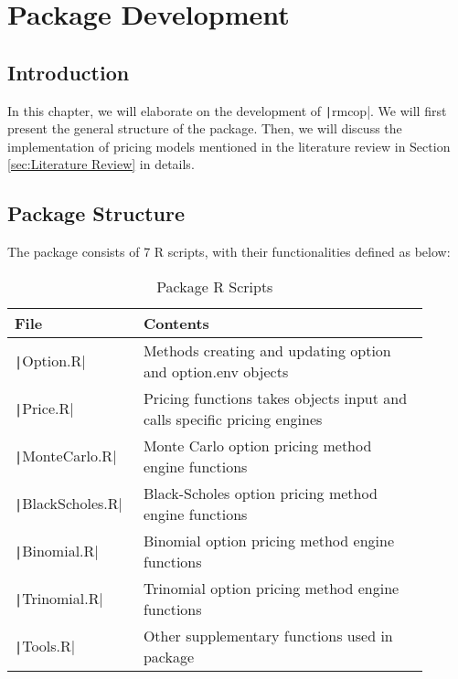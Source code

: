 \chapter{Package Development} \label{cpt:Pkg Dev}

\section{Introduction}

In this chapter, we will elaborate on the development of \texttt|rmcop|. We will first present the general structure of the package. Then, we will discuss the implementation of pricing models mentioned in the literature review in Section \ref{sec:Literature Review} in details.

\section{Package Structure}

The package consists of 7 R scripts, with their functionalities defined as below:

\begin{table}[ht] \label{tab:pkg_scripts}
\begin{tabular}{p{0.25\linewidth} | p{0.65\linewidth}}
File                           & Contents                                                                 \\ \hline
\texttt|Option.R|       & Methods creating and updating option and option.env objects              \\
\texttt|Price.R|        & Pricing functions takes objects input and calls specific pricing engines \\
\texttt|MonteCarlo.R|   & Monte Carlo option pricing method engine functions                       \\
\texttt|BlackScholes.R| & Black-Scholes option pricing method engine functions                     \\
\texttt|Binomial.R|     & Binomial option pricing method engine functions                          \\
\texttt|Trinomial.R|    & Trinomial option pricing method engine functions                         \\
\texttt|Tools.R|        & Other supplementary functions used in package                           
\end{tabular}
\caption{Package R Scripts}
\end{table} 

